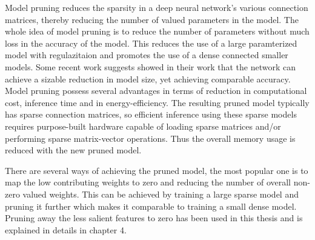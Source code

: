 Model pruning reduces the sparsity in a deep neural network's
various connection matrices, thereby reducing the number of valued parameters in the model. The whole idea of model pruning is to reduce the number of parameters without much loss in the accuracy of the model. This reduces the use of a large paramterized model with regulazitaion and promotes the use of a dense connected smaller models. Some recent work suggests \cite{DBLP:journals/corr/HanMD15} \cite{DBLP:journals/corr/NarangDSE17} showed in their work that the network can achieve a sizable reduction in model size, yet achieving comparable accuracy. 
Model pruning possess several advantages in terms of reduction in computational cost, inference time and in energy-efficiency. The resulting pruned model typically has sparse connection matrices, so
efficient inference using these sparse models requires purpose-built hardware capable of loading sparse matrices and/or performing sparse matrix-vector operations. Thus the overall memory usage is reduced with the new pruned model. 


There are several ways of achieving the pruned model, the most popular one is to map the low contributing weights to zero and reducing the number of overall non-zero valued weights. This can be achieved by training a large sparse model and pruning it further which makes it comparable to training a small dense model. Pruning away the less salient features to zero has been used in this thesis and is explained in details in chapter 4. 


